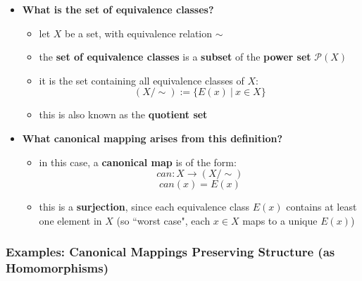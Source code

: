 \documentclass{exam}
\begin{document}
\begin{itemize}
    \item \textbf{What is the set of equivalence classes?}
    \begin{itemize}
        \item let $X$ be a set, with equivalence relation $\sim$
        \item the \textbf{set of equivalence classes} is a \textbf{subset} of the \textbf{power set} $\mathcal{P}(X)$
        \item it is the set containing all equivalence classes of $X$:
        \[
        (X / \sim) := \{E(x) \ | \ x \in X\}
        \]
        \item this is also known as the \textbf{quotient set}
    \end{itemize}
    \item \textbf{What canonical mapping arises from this definition?}
    \begin{itemize}
        \item in this case, a \textbf{canonical map} is of the form:
        \[
        can : X \to (X / \sim)
        \]
        \[
        can(x) = E(x)
        \]
        \item this is a \textbf{surjection}, since each equivalence class $E(x)$ contains at least one element in $X$ (so ``worst case", each $x \in X$ maps to a unique $E(x)$)
    \end{itemize}
\end{itemize}

\subsubsection{Examples: Canonical Mappings Preserving Structure (as Homomorphisms)}
\end{document}
